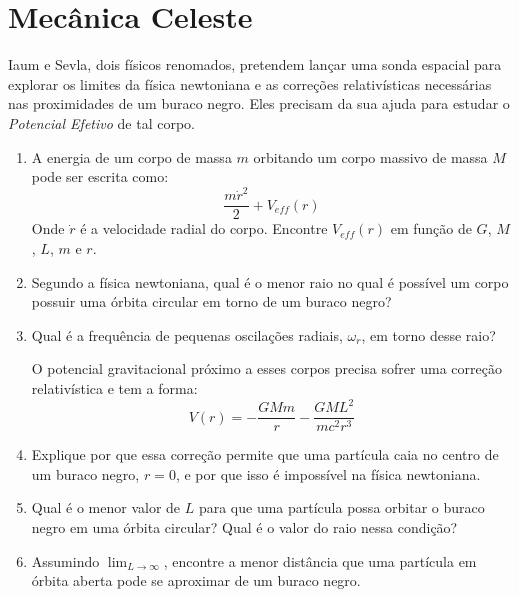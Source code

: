 \documentclass[11pt]{article}
\begin{document}
\section{Mecânica Celeste}
\begin{pproblem}
    Iaum e Sevla, dois físicos renomados, pretendem lançar uma sonda espacial para explorar os limites da física newtoniana e as correções relativísticas necessárias nas proximidades de um buraco negro. Eles precisam da sua ajuda para estudar o \textit{Potencial Efetivo} de tal corpo.
    \begin{enumerate}[label=\textbf{\alph*)}]
        \item A energia de um corpo de massa \(m\) orbitando um corpo massivo de massa \(M\) pode ser escrita como:
             \[
             \frac{m\dot r ^2}{2} + V_{eff}(r)
             \]
             Onde \(\dot r\) é a velocidade radial do corpo. Encontre \(V_{eff}(r)\) em função de \(G\), \(M\), \(L\), \(m\) e \(r\).

        \item Segundo a física newtoniana, qual é o menor raio no qual é possível um corpo possuir uma órbita circular em torno de um buraco negro?
    
        \item Qual é a frequência de pequenas oscilações radiais, \(\omega_r\), em torno desse raio?

        O potencial gravitacional próximo a esses corpos precisa sofrer uma correção relativística e tem a forma:
        \[
        V(r) = -\frac{GMm}{r} - \frac{GML^2}{mc^2r^3}
        \]

        \item Explique por que essa correção permite que uma partícula caia no centro de um buraco negro, \(r=0\), e por que isso é impossível na física newtoniana.
        
        \item Qual é o menor valor de \(L\) para que uma partícula possa orbitar o buraco negro em uma órbita circular? Qual é o valor do raio nessa condição?
        
        \item Assumindo \( \lim_{L \to \infty}\), encontre a menor distância que uma partícula em órbita aberta pode se aproximar de um buraco negro.  
    \end{enumerate}
    
\end{pproblem}
\end{document}
